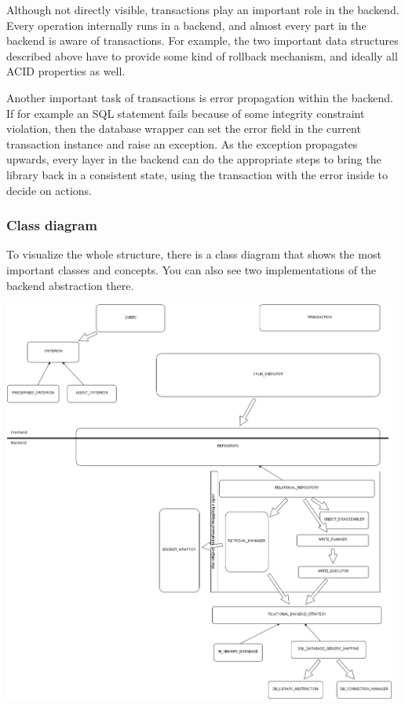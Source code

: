 Although not directly visible, transactions play an important role in the backend.
Every operation internally runs in a backend, and almost every part in the backend is aware of transactions.
For example, the two important data structures described above have to provide some kind of rollback mechanism, and ideally all ACID properties as well.

Another important task of transactions is error propagation within the backend.
If for example an SQL statement fails because of some integrity constraint violation, then the database wrapper can set the error field in the current transaction instance and raise an exception.
As the exception propagates upwards, every layer in the backend can do the appropriate steps to bring the library back in a consistent state, using the transaction with the error inside to decide on actions.

\subsubsection{Class diagram}

To visualize the whole structure, there is a class diagram that shows the most important classes and concepts. 
You can also see two implementations of the backend abstraction there.

\includegraphics[width = 13cm] {class_diagram.png}


